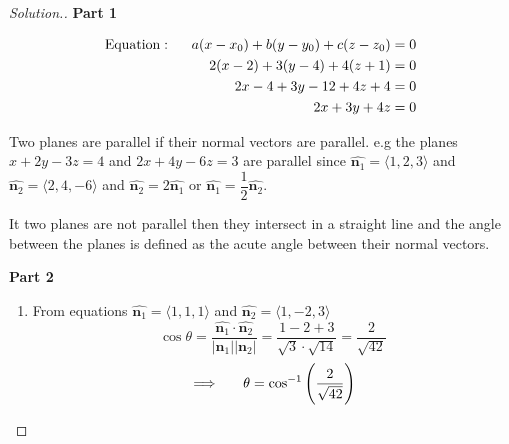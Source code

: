 \documentclass[11pt,a4paper]{article}
\theoremstyle{definition}
\newenvironment{solution}
  {\renewcommand{\qedsymbol}{}\begin{proof}[\textit{Solution}.]}
  {\end{proof}}
\newcommand{\subhead}[1]{%
  \par\medskip\noindent\textbf{#1}\par\nobreak\smallskip}
\begin{document}
\begin{solution}
\subhead{Part 1}
\begin{align*}
\text{Equation}:\hspace{0.5cm} a(x - x_0) + b(y - y_0) + c( z - z_0) & = 0\\
2(x - 2) + 3(y - 4) + 4(z + 1) & = 0\\
2x - 4 + 3y -12 + 4z + 4 & = 0\\
2x + 3y + 4z & = 0
\end{align*}

Two planes are parallel if their normal vectors are parallel. e.g the planes $x + 2y - 3z = 4$ and $2x + 4y -6z = 3$ are parallel since $\widehat{\textbf{n}_1} = \langle 1,2,3\rangle$ and $\widehat{\textbf{n}_2} = \langle 2, 4, -6\rangle$ and $\widehat{\textbf{n}_2} = 2\widehat{\textbf{n}_1}$ or $\widehat{\textbf{n}_1} =\dfrac{1}{2} \widehat{\textbf{n}_2}$.

It two planes are not parallel then they intersect in a straight line and the angle between the planes is defined as the acute angle between their normal vectors.


\begin{figure}[H]
\centering
{}
\end{figure}

\subhead{Part 2}
\begin{enumerate}
\item From equations $\hat{\textbf{n}_1} = \langle 1,1,1\rangle$ and $\hat{\textbf{n}_2} = \langle 1, -2, 3\rangle$
$$ \cos \theta = \frac{\hat{\textbf{n}_1}\cdot \hat{\textbf{n}_2}}{
\left|\textbf{n}_1\right|\left|\textbf{n}_2\right|
} = \frac{1 - 2 + 3}{\sqrt{3}\cdot\sqrt{14}} = \frac{2}{\sqrt{42}}$$
$$\implies \hspace{0.5cm} \theta = \cos^{-1}\Bigg( \frac{2}{\sqrt{42}}\Bigg)$$


\end{enumerate}
\end{solution}
\end{document}
